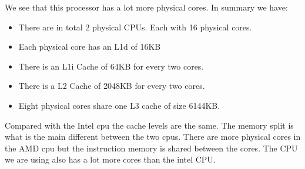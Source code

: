 We see that this processor has a lot more physical cores. In summary we have:

\begin{itemize}
    \item There are in total 2 physical CPUs. Each with 16 physical cores.
    \item Each physical core has an L1d of 16KB
    \item There is an L1i Cache of 64KB for every two cores. 
    \item There is a L2 Cache of 2048KB for every two cores.
    \item Eight physical cores share one L3 cache of size 6144KB.
\end{itemize}

Compared with the Intel cpu the cache levels are the same. The memory split
is what is the main different between the two cpus. There are more physical
cores in the AMD cpu but the instruction memory is shared between the cores. 
The CPU we are using also has a lot more cores than the intel CPU.